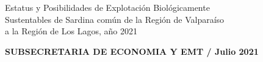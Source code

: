 \documentclass[12pt, oneside]{article} %
\begin{document}
\begin{titlepage}
\begin{minipage}{\textwidth}
{            \centering \fontsize{9pt}{8pt}\selectfont
            \vspace*{-5mm} 
            \hfill \begin{flushright}
            Estatus y Posibilidades de Explotación Biológicamente \\ Sustentables de Sardina común de la  Región de Valparaíso \\ a la Región de Los Lagos, año 2021
			\end{flushright} 
              
			\centering \fontsize{10pt}{8pt}\selectfont
            \vspace*{2mm} 
            \hfill \textbf{SUBSECRETARIA DE ECONOMIA Y EMT / Julio 2021}
                        
            \vspace*{0.2cm}
        }
    \end{minipage}

\end{titlepage}
\endgroup
\end{document}
